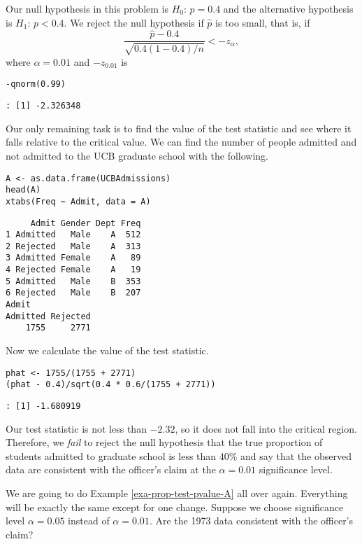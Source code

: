 Our null hypothesis in this problem is \(H_{0}:\,p = 0.4\) and the
alternative hypothesis is \(H_{1}:\,p < 0.4\). We reject the null
hypothesis if \(\hat{p}\) is too small, that is, if
\begin{equation}
\frac{\hat{p} - 0.4}{\sqrt{0.4(1 - 0.4)/n}} < -z_{\alpha},
\end{equation}
where \(\alpha = 0.01\) and \(-z_{0.01}\) is 
\begin{verbatim}
-qnorm(0.99)
\end{verbatim}

\begin{verbatim}
: [1] -2.326348
\end{verbatim}

Our only remaining task is to find the value of the test statistic and
see where it falls relative to the critical value. We can find the
number of people admitted and not admitted to the UCB graduate school
with the following.

\begin{verbatim}
A <- as.data.frame(UCBAdmissions)
head(A)
xtabs(Freq ~ Admit, data = A)
\end{verbatim}

\begin{verbatim}
     Admit Gender Dept Freq
1 Admitted   Male    A  512
2 Rejected   Male    A  313
3 Admitted Female    A   89
4 Rejected Female    A   19
5 Admitted   Male    B  353
6 Rejected   Male    B  207
Admit
Admitted Rejected 
    1755     2771
\end{verbatim}

Now we calculate the value of the test statistic.

\begin{verbatim}
phat <- 1755/(1755 + 2771)
(phat - 0.4)/sqrt(0.4 * 0.6/(1755 + 2771)) 
\end{verbatim}

\begin{verbatim}
: [1] -1.680919
\end{verbatim}

Our test statistic is not less than \(-2.32\), so it does not fall
into the critical region. Therefore, we \emph{fail} to reject the null
hypothesis that the true proportion of students admitted to graduate
school is less than 40\% and say that the observed data are consistent
with the officer's claim at the \(\alpha = 0.01\) significance level.



\label{exa-prop-test-pvalue-B} We are going to do Example
\ref{exa-prop-test-pvalue-A} all over again. Everything will be exactly the
same except for one change. Suppose we choose significance level
\(\alpha = 0.05\) instead of \(\alpha = 0.01\). Are the 1973 data
consistent with the officer's claim?

